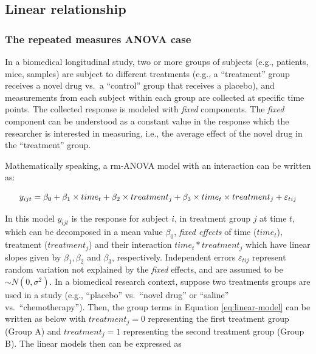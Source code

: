\documentclass[
]{article}
\begin{document}
\hypertarget{linear-relationship}{%
\subsection{Linear relationship}\label{linear-relationship}}

\hypertarget{the-repeated-measures-anova-case}{%
\subsubsection{The repeated measures ANOVA case}\label{the-repeated-measures-anova-case}}

In a biomedical longitudinal study, two or more groups of subjects (e.g., patients, mice, samples) are subject to different treatments (e.g., a ``treatment'' group receives a novel drug vs.~a ``control'' group that receives a placebo), and measurements from each subject within each group are collected at specific time points. The collected response is modeled with \emph{fixed} components. The \emph{fixed} component can be understood as a constant value in the response which the researcher is interested in measuring, i.e., the average effect of the novel drug in the ``treatment'' group.

Mathematically speaking, a rm-ANOVA model with an interaction can be written as:

\begin{equation}
y_{ijt} = \beta_0+ \beta_1 \times time_{t} + \beta_2 \times treatment_{j} + \beta_3 \times time_{t}\times treatment_{j}+\varepsilon_{tij}\\ 
\label{eq:linear-model}
\end{equation}

In this model \(y_{ijt}\) is the response for subject \(i\), in treatment group \(j\) at time \(t\), which can be decomposed in a mean value \(\beta_0\), \emph{fixed effects} of time (\(time_t\)), treatment (\(treatment_j\)) and their interaction \(time_t*treatment_j\) which have linear slopes given by \(\beta_1, \beta_2\) and \(\beta_3\), respectively. Independent errors \(\varepsilon_{tij}\) represent random variation not explained by the \emph{fixed} effects, and are assumed to be \(\sim N(0,\sigma^2)\).
In a biomedical research context, suppose two treatments groups are used in a study (e.g., ``placebo'' vs.~``novel drug'' or ``saline'' vs.~``chemotherapy''). Then, the group terms in Equation \eqref{eq:linear-model} can be written as below with \(treatment_j=0\) representing the first treatment group (Group A) and \(treatment_j=1\) representing the second treatment group (Group B). The linear models then can be expressed as
\end{document}
